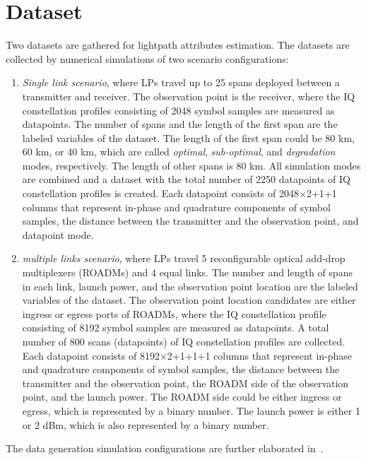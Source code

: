 \documentclass[lettersize,journal, one-column]{IEEEtran}
\begin{document}
\section{Dataset}
\label{section:dataset}
Two datasets are gathered for lightpath attributes estimation.
The datasets are collected by numerical simulations of two scenario configurations:
\begin{enumerate}
    \item \textit{Single link scenario}, where LPs travel up to 25 spans deployed between a transmitter and receiver.
    The observation point is the receiver, where the IQ constellation profiles consisting of 2048 symbol samples are measured as datapoints.
    The number of spans and the length of the first span are the labeled variables of the dataset.
    The length of the first span could be 80 km, 60 km, or 40 km, which are called \textit{optimal}, \textit{sub-optimal}, and \textit{degradation} modes, respectively.
    The length of other spans is 80 km.
    All simulation modes are combined and a dataset with the total number of 2250 datapoints of IQ constellation profiles is created. 
    Each datapoint consists of 2048$\times$2+1+1 columns that represent in-phase and quadrature components of symbol samples, the distance between the transmitter and the observation point, and datapoint mode.
    \item \textit{multiple links scenario}, where LPs travel 5 reconfigurable optical add-drop multiplexers (ROADMs) and 4 equal links.
    The number and length of spans in each link, launch power, and the observation point location are the labeled variables of the dataset.
    The observation point location candidates are either ingress or egress ports of ROADMs, where the IQ constellation profile consisting of 8192 symbol samples are measured as datapoints.
    A total number of 800 scans (datapoints) of IQ constellation profiles are collected.
    Each datapoint consists of 8192$\times$2+1+1+1 columns that represent in-phase and quadrature components of symbol samples, the distance between the transmitter and the observation point, the ROADM side of the observation point, and the launch power.
    The ROADM side could be either ingress or egress, which is represented by a binary number.
    The launch power is either 1 or 2 dBm, which is also represented by a binary number.
\end{enumerate}
The data generation simulation configurations are further elaborated in~\cite{data146_2022}.
\end{document}
